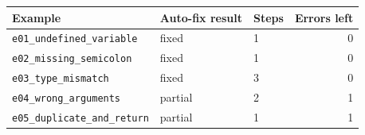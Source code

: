 \begin{tabular}{@{}lllr@{}}\toprule
\textbf{Example} & \textbf{Auto-fix result} & \textbf{Steps} & \textbf{Errors left}\\ \midrule
\texttt{e01\_undefined\_variable} & fixed & 1 & 0\\
\texttt{e02\_missing\_semicolon} & fixed & 1 & 0\\
\texttt{e03\_type\_mismatch} & fixed & 3 & 0\\
\texttt{e04\_wrong\_arguments} & partial & 2 & 1\\
\texttt{e05\_duplicate\_and\_return} & partial & 1 & 1\\
\bottomrule
\end{tabular}
